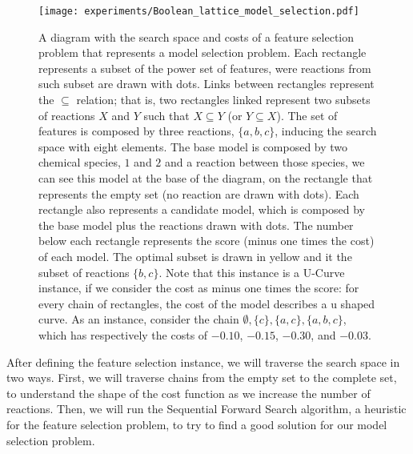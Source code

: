 \begin{figure}[ht]
\begin{center}
    \texttt{[image: experiments/Boolean\_lattice\_model\_selection.pdf]}
    \caption{A diagram with the search space and costs of a feature 
    selection problem that represents a model selection problem. Each 
    rectangle represents a subset of the power set of features, were
    reactions from such subset are drawn with dots. Links between 
    rectangles represent the $\subseteq$ relation; that is, two 
    rectangles linked represent two subsets of reactions $X$ and $Y$ 
    such that $X \subseteq Y$ (or $Y \subseteq X$). The set of features 
    is composed by three reactions, $\{a, b, c\}$, inducing the search 
    space with eight elements. The base model is composed by two 
    chemical species, $1$ and $2$ and a reaction between those species, 
    we can see this model at the base of the diagram, on the rectangle 
    that represents the empty set (no reaction are drawn with dots). 
    Each rectangle also represents a candidate model, which is composed 
    by the base model plus the reactions drawn with dots. The number
    below each rectangle represents the score (minus one times the cost)
    of each model. The optimal subset is drawn in yellow and it the
    subset of reactions $\{b, c\}$. Note that this instance is a U-Curve 
    instance, if we consider the cost as minus one times the score: for 
    every chain of rectangles, the cost of the model describes a u 
    shaped curve. As an instance, consider the chain $\emptyset, \{c\} 
    , \{a, c\}, \{a, b, c\}$, which has respectively the costs of
    $-0.10$, $-0.15$, $-0.30$, and $-0.03$.}
    \label{fig:feature_selection_model_selection}
    \end{center}
\end{figure}

After defining the feature selection instance, we will traverse the
search space in two ways. First, we will traverse chains from the empty
set to the complete set, to understand the shape of the cost function as
we increase the number of reactions. Then, we will run the Sequential 
Forward Search algorithm, a heuristic for the feature selection problem,
to try to find a good solution for our model selection problem.





